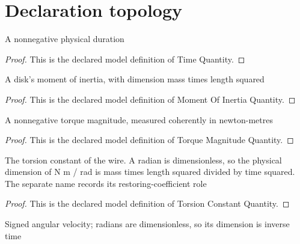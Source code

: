 \section{Declaration topology}
\begin{definition}
  \label{def:physics:phyx-mini-0278:phyxminiproblems-problemphyxmini0278-timequantity}
  A nonnegative physical duration
\end{definition}
\begin{proof}
  This is the declared model definition of Time Quantity.
\end{proof}
\begin{definition}
  \label{def:physics:phyx-mini-0278:phyxminiproblems-problemphyxmini0278-momentofinertiaquantity}
  A disk's moment of inertia, with dimension mass times length squared
\end{definition}
\begin{proof}
  This is the declared model definition of Moment Of Inertia Quantity.
\end{proof}
\begin{definition}
  \label{def:physics:phyx-mini-0278:phyxminiproblems-problemphyxmini0278-torquemagnitudequantity}
  A nonnegative torque magnitude, measured coherently in newton-metres
\end{definition}
\begin{proof}
  This is the declared model definition of Torque Magnitude Quantity.
\end{proof}
\begin{definition}
  \label{def:physics:phyx-mini-0278:phyxminiproblems-problemphyxmini0278-torsionconstantquantity}
  The torsion constant of the wire. A radian is dimensionless, so the physical dimension of N m / rad is mass times length squared divided by time squared. The separate name records its restoring-coefficient role
\end{definition}
\begin{proof}
  This is the declared model definition of Torsion Constant Quantity.
\end{proof}
\begin{definition}
  \label{def:physics:phyx-mini-0278:phyxminiproblems-problemphyxmini0278-signedangularvelocityquantity}
  Signed angular velocity; radians are dimensionless, so its dimension is inverse time
\end{definition}
